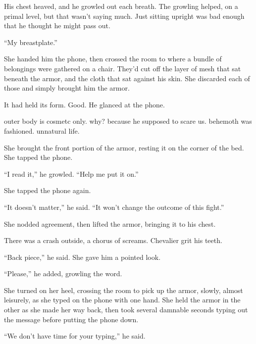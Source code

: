 His chest heaved, and he growled out each breath.  The growling helped, on a primal level, but that wasn't saying much.  Just sitting upright was bad enough that he thought he might pass out.



``My breastplate.''



She handed him the phone, then crossed the room to where a bundle of belongings were gathered on a chair.  They'd cut off the layer of mesh that sat beneath the armor, and the cloth that sat against his skin.  She discarded each of those and simply brought him the armor.



It had held its form.  Good.  He glanced at the phone.



outer body is cosmetc only.  why?  because he supposed to scare us.  behemoth was fashioned.  unnatural life.



She brought the front portion of the armor, resting it on the corner of the bed.  She tapped the phone.



``I read it,'' he growled.  ``Help me put it on.''



She tapped the phone again.



``It doesn't matter,'' he said.  ``It won't change the outcome of this fight.''



She nodded agreement, then lifted the armor, bringing it to his chest.



There was a crash outside, a chorus of screams.  Chevalier grit his teeth.



``Back piece,'' he said.  She gave him a pointed look.



``Please,'' he added, growling the word.



She turned on her heel, crossing the room to pick up the armor, slowly, almost leisurely, as she typed on the phone with one hand.  She held the armor in the other as she made her way back, then took several damnable seconds typing out the message before putting the phone down.



``We don't have time for your typing,'' he said.



